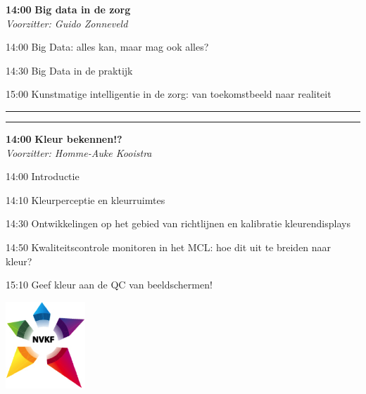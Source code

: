 \documentclass[a4paper,10pt]{report}
\begin{document}
\begin{multicols*}{3}
\vfill

\begin{packed_enum}
\item[\textbf{14:00}] \textbf{Big data in de zorg}\\\textit{Voorzitter: Guido Zonneveld}
\item[14:00] Big Data: alles kan, maar mag ook alles?
\item[14:30] Big Data in de praktijk
\item[15:00] Kunstmatige intelligentie in de zorg: van toekomstbeeld naar realiteit
\end{packed_enum} %

\columnbreak

\hrule \vspace{2mm}
\vspace{2mm}\hrule\strut

\begin{packed_enum}
\item[\textbf{14:00}] \textbf{Kleur bekennen!?}\\\textit{Voorzitter: Homme-Auke Kooistra}
\item[14:00] Introductie
\item[14:10] Kleurperceptie en kleurruimtes
\item[14:30] Ontwikkelingen op het gebied van richtlijnen en kalibratie kleurendisplays
\item[14:50] Kwaliteitscontrole monitoren in het MCL: hoe dit uit te breiden naar kleur?
\item[15:10] Geef kleur aan de QC van beeldschermen!
\end{packed_enum} %

\vfill

\begin{center}
\includegraphics[width=3cm]{nvkf_logo}
\end{center}


\end{multicols*}
\end{document}
